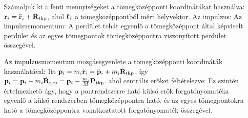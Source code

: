    Számoljuk ki a fenti mennyiségeket a tömegközépponti koordinátákat használva: $\mathbf{r}_i=\bar{\mathbf{r}}_i+\mathbf{R}_\text{tkp}$, ahol $\bar{\mathbf{r}}_i$ a tömegközéppontból mért helyvektor. Az impulzus:
   Az impulzusmomentum:
   A perdület tehát egyenlő a tömegközéppont által képviselt perdület és az egyes tömegpontok tömegközéppontra viszonyított perdület összegével.
   
   Az impulzusmomentum mozgásegyenlete a tömegközépponti koordináták használatával:
   Itt $\mathbf{p}_i=m_i\dot{\mathbf{r}}_i={\bar{\mathbf{p}}}_i+m_i\dot{\mathbf{R}}_\text{tkp}$, így ${\bar{\mathbf{p}}}_i=\mathbf{p}_i-m_i\dot{\mathbf{R}}_\text{tkp}=\mathbf{p}_i-\frac{m_i}{M}\mathbf{P}_\text{tkp}$.
   ahol centrális erőket feltételezve:
   Ez szintén értelmezhető úgy, hogy a pontrendszerre ható külső erők forgatónyomatéka egyenlő a külső rendszerben tömegközéppontra ható, és az egyes tömegpontokra ható a tömegközéppontra vonatkoztatott forgatónyomaték összegével.
   

